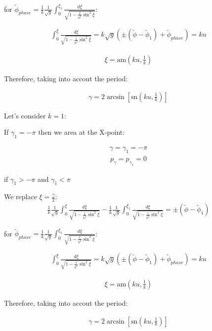 \documentclass[11pt,a4paper,oneside]{article}
\begin{document}
for $\tilde{\phi}_{phase}=\frac{1}{k}\frac{1}{\sqrt{g}}\int_{0}^{\xi_1}\frac{d \xi}{\sqrt{1-\frac{1}{k^2}\sin^2\xi}}$:

\begin{align}
\int_{0}^\xi\frac{d \xi}{\sqrt{1-\frac{1}{k^2}\sin^2\xi}}=k\sqrt{g}(\pm(\tilde{\phi}-\tilde{\phi}_1)+\tilde{\phi}_{phase})=ku
\end{align}

\begin{align}
\xi=\mathrm{am}(ku,\frac{1}{k})
\end{align}

Therefore, taking into accout the period:

\begin{align}
\gamma=2\arcsin[\mathrm{sn}(ku,\frac{1}{k})]
\end{align}

Let's consider $k = 1$: 

If $\gamma_1 = -\pi$ then we area at the X-point:

\begin{align}
\gamma=\gamma_1= -\pi
\end{align}
\begin{align}
p_\gamma=p_{\gamma_1}=0
\end{align}

if $\gamma_1 > -\pi$ and $\gamma_1 < \pi$

We replace $\xi= \frac{\gamma}{2}$:
\begin{align}
\frac{1}{k}\frac{1}{\sqrt{g}}\int_{0}^\xi\frac{d \xi}{\sqrt{1-\frac{1}{k^2}\sin^2\xi}}-\frac{1}{k}\frac{1}{\sqrt{g}}\int_{0}^{\xi_1}\frac{d \xi}{\sqrt{1-\frac{1}{k^2}\sin^2\xi}}=\pm(\tilde{\phi}-\tilde{\phi}_1)
\end{align}

for $\tilde{\phi}_{phase}=\frac{1}{k}\frac{1}{\sqrt{g}}\int_{0}^{\xi_1}\frac{d \xi}{\sqrt{1-\frac{1}{k^2}\sin^2\xi}}$:

\begin{align}
\int_{0}^\xi\frac{d \xi}{\sqrt{1-\frac{1}{k^2}\sin^2\xi}}=k\sqrt{g}(\pm(\tilde{\phi}-\tilde{\phi}_1)+\tilde{\phi}_{phase})=ku
\end{align}

\begin{align}
\xi=\mathrm{am}(ku,\frac{1}{k})
\end{align}

Therefore, taking into accout the period:

\begin{align}
\gamma=2\arcsin[\mathrm{sn}(ku,\frac{1}{k})]
\end{align}
\end{document}
